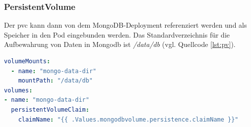 \subsubsection{PersistentVolume}

Der \acs{pvc} kann dann von dem MongoDB-Deployment referenziert werden 
und als Speicher in den Pod eingebunden werden. 
Das Standardverzeichnis für die Aufbewahrung von Daten in Mongodb ist \textit{/data/db} \cite{mongodbpath} (vgl. Quellcode \ref{lst:pv}).

\begin{lstlisting}[caption={Ausschnitt aus dem mongodb-deployment.yaml },captionpos=b,label={lst:pv},language=yaml]
  volumeMounts:
  - name: "mongo-data-dir"
    mountPath: "/data/db"
volumes:
- name: "mongo-data-dir"
  persistentVolumeClaim:
    claimName: "{{ .Values.mongodbvolume.persistence.claimName }}"
\end{lstlisting}
